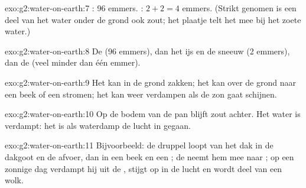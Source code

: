 \begin{solution}{exo:g2:water-on-earth:7}
: 96 emmers. : $2 + 2 = 4$ emmers.
(Strikt genomen is een deel van het water onder de grond ook zout; het
plaatje telt het mee bij het zoete water.)
\end{solution}

\begin{solution}{exo:g2:water-on-earth:8}
De  (96 emmers), dan het ijs en de sneeuw (2 emmers), dan de
 (veel minder dan één emmer).
\end{solution}

\begin{solution}{exo:g2:water-on-earth:9}
Het kan in de grond zakken; het kan over de grond naar een beek of een
 stromen; het kan weer verdampen als de zon gaat schijnen.
\end{solution}

\begin{solution}{exo:g2:water-on-earth:10}
Op de bodem van de pan blijft zout achter. Het water is verdampt: het is
als waterdamp de lucht in gegaan.
\end{solution}

\begin{solution}{exo:g2:water-on-earth:11}
Bijvoorbeeld: de druppel loopt van het dak in de dakgoot en de afvoer, dan
in een beek en een ; de  neemt hem mee naar ; op een zonnige
dag verdampt hij uit de , stijgt op in de lucht en wordt deel van een
wolk.
\end{solution}
